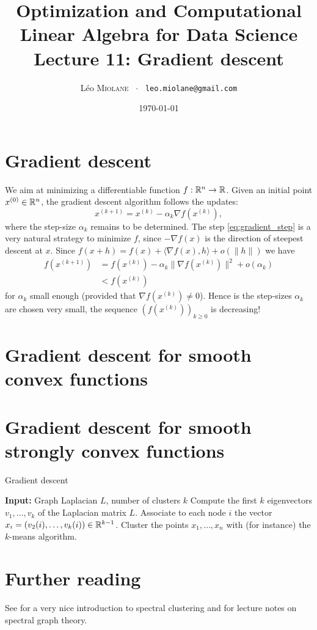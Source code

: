 \documentclass[11pt,nocut]{article}
\title{\vspace{-2.0cm}%
	Optimization and Computational Linear Algebra for Data Science\\
Lecture 11: Gradient descent}
\author{Léo \textsc{Miolane} \ $\cdot$ \ \texttt{leo.miolane@gmail.com}}
\date{\today}
\begin{document}
\maketitle


\section{Gradient descent}

We aim at minimizing a differentiable function $f: \mathbb{R}^n \to \mathbb{R}$.
Given an initial point $x^{(0)} \in \mathbb{R}^n$, the gradient descent algorithm follows the updates:
\begin{equation}\label{eq:gradient_step}
x^{(k+1)} = x^{(k)} - \alpha_k \nabla f(x^{(k)}),
\end{equation}
where the step-size $\alpha_k$ remains to be determined.
The step \eqref{eq:gradient_step} is a very natural strategy to minimize $f$, since $-\nabla f(x)$ is the direction of steepest descent at $x$. Since $f(x+h) = f(x) + \langle \nabla f(x), h \rangle + o(\|h\|)$ we have
\begin{align*}
f(x^{(k+1)}) 
&= f(x^{(k)}) - \alpha_k \| \nabla f(x^{(k)}) \|^2 + o(\alpha_k) \\
&< f(x^{(k)}) 
\end{align*}
for $\alpha_k$ small enough (provided that $\nabla f(x^{(k)}) \neq 0$).
Hence is the step-sizes $\alpha_k$ are chosen very small, the sequence $(f(x^{(k)}))_{k \geq 0}$ is decreasing!

\section{Gradient descent for smooth convex functions}
\section{Gradient descent for smooth strongly convex functions}



\begin{algorithm}
\caption{Gradient descent}
\begin{algorithmic}[1]
	\Statex \textbf{Input:} Graph Laplacian $L$, number of clusters $k$
	\State Compute the first $k$ eigenvectors $v_1, \dots, v_k$ of the Laplacian matrix $L$.
	\State Associate to each node $i$ the vector $x_i = (v_2(i), \dots, v_k(i)) \in \mathbb{R}^{k-1}$.
	\State Cluster the points $x_1, \dots, x_n$ with (for instance) the $k$-means algorithm.
\end{algorithmic}
\end{algorithm}


\section*{Further reading}

See \cite{von2007tutorial} for a very nice introduction to spectral clustering and \cite{spielman2012spectral} for lecture notes on spectral graph theory.

\vspace{1cm}
\centerline{}




\end{document}
